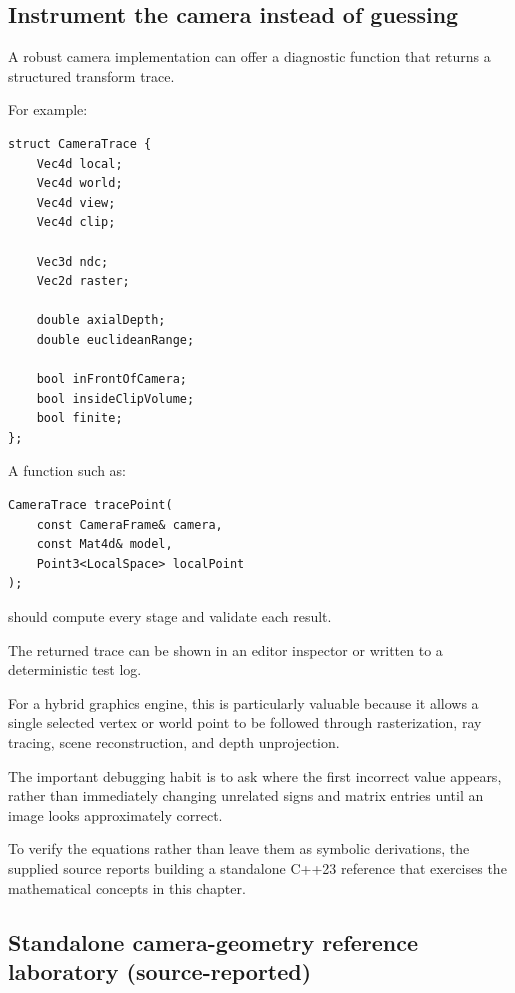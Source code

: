 \subsection{Instrument the camera instead of guessing}\label{02-foundations-ii-ch037-instrument-the-camera-instead-of-guessing}

\hypertarget{02-foundations-ii-ch037-instrument-the-camera-instead-of-guessing}{}

A robust camera implementation can offer a diagnostic function that returns a structured transform trace.

For example:

\begin{verbatim}
struct CameraTrace {
    Vec4d local;
    Vec4d world;
    Vec4d view;
    Vec4d clip;

    Vec3d ndc;
    Vec2d raster;

    double axialDepth;
    double euclideanRange;

    bool inFrontOfCamera;
    bool insideClipVolume;
    bool finite;
};
\end{verbatim}

A function such as:

\begin{verbatim}
CameraTrace tracePoint(
    const CameraFrame& camera,
    const Mat4d& model,
    Point3<LocalSpace> localPoint
);
\end{verbatim}

should compute every stage and validate each result.

The returned trace can be shown in an editor inspector or written to a deterministic test log.

For a hybrid graphics engine, this is particularly valuable because it allows a single selected vertex or world point to be followed through rasterization, ray tracing, scene reconstruction, and depth unprojection.

The important debugging habit is to ask where the first incorrect value appears, rather than immediately changing unrelated signs and matrix entries until an image looks approximately correct.

To verify the equations rather than leave them as symbolic derivations, the supplied source reports building a standalone C++23 reference that exercises the mathematical concepts in this chapter.

\subsection{Standalone camera-geometry reference laboratory (source-reported)}\label{02-foundations-ii-ch037-standalone-camera-geometry-reference-laboratory-source-reported}


